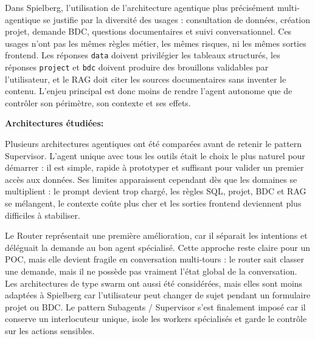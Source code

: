 \documentclass[a4paper,11pt,english,openany]{book}
\begin{document}
Dans Spielberg, l'utilisation de l'architecture agentique plus précisément multi-agentique se justifie par la diversité des usages : consultation de données, création projet, demande BDC, questions documentaires et suivi conversationnel. Ces usages n'ont pas les mêmes règles métier, les mêmes risques, ni les mêmes sorties frontend. Les réponses \texttt{data} doivent privilégier les tableaux structurés, les réponses \texttt{project} et \texttt{bdc} doivent produire des brouillons validables par l'utilisateur, et le RAG doit citer les sources documentaires sans inventer le contenu. L'enjeu principal est donc moins de rendre l'agent autonome que de contrôler son périmètre, son contexte et ses effets.

\textbf{Architectures étudiées:}

Plusieurs architectures agentiques ont été comparées avant de retenir le pattern Supervisor. L'agent unique avec tous les outils était le choix le plus naturel pour démarrer : il est simple, rapide à prototyper et suffisant pour valider un premier accès aux données. Ses limites apparaissent cependant dès que les domaines se multiplient : le prompt devient trop chargé, les règles SQL, projet, BDC et RAG se mélangent, le contexte coûte plus cher et les sorties frontend deviennent plus difficiles à stabiliser.

Le Router représentait une première amélioration, car il séparait les intentions et déléguait la demande au bon agent spécialisé. Cette approche reste claire pour un POC, mais elle devient fragile en conversation multi-tours : le router sait classer une demande, mais il ne possède pas vraiment l'état global de la conversation. Les architectures de type swarm ont aussi été considérées, mais elles sont moins adaptées à Spielberg car l'utilisateur peut changer de sujet pendant un formulaire projet ou BDC. Le pattern Subagents / Supervisor s'est finalement imposé car il conserve un interlocuteur unique, isole les workers spécialisés et garde le contrôle sur les actions sensibles.
\end{document}
